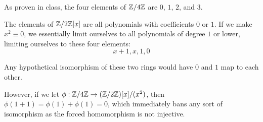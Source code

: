\documentclass[12pt]{article}
\begin{document}
As proven in class, the four elements of $\mathbb{Z}/4\mathbb{Z}$ are $0$, $1$, $2$, and $3$.

The elements of $\mathbb{Z}/2\mathbb{Z}[x]$ are all polynomials with coefficients $0$ or $1$.
If we make $x^2 \equiv 0$, we essentially limit ourselves to all polynomials
of degree $1$ or lower, limiting ourselves to these four elements:
\[x+1, x, 1, 0\]

Any hypothetical isomorphism of these two rings would have $0$ and $1$ map to each other.

However, if we let $\phi: \mathbb{Z}/4\mathbb{Z} \to (\mathbb{Z}/2\mathbb{Z})[x]/(x^2)$, then $\phi(1+1)=\phi(1)+\phi(1)=0$,
which immediately bans any sort of isomorphism as the forced homomorphism is not injective.
\end{document}
